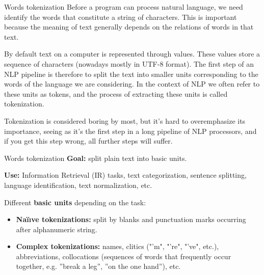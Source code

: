\begin{frame}[containsverbatim]{Words tokenization}
    Before a program can process natural language, we need identify the words that constitute a string of characters. This is important because the meaning of text generally depends on the relations of words in that text.
    
    By default text on a computer is represented through  values. These values store a sequence of characters (nowadays mostly in UTF-8 format). The first step of an NLP pipeline is therefore to split the text into smaller units corresponding to the words of the language we are considering. In the context of NLP we often refer to these units as tokens, and the process of extracting these units is called tokenization.
    
    Tokenization is considered boring by most, but it's hard to overemphasize its importance, seeing as it's the first step in a long pipeline of NLP processors, and if you get this step wrong, all further steps will suffer.
\end{frame}

\begin{frame}[containsverbatim]{Words tokenization}
    \textbf{Goal:} split plain text into basic units.
    
    \textbf{Use:} Information Retrieval (IR) tasks, text categorization, sentence splitting, language identification, text normalization, etc.
    
    Different \textbf{basic units} depending on the task:
    \begin{itemize}
        \item \textbf{Naïıve tokenizations:} split by blanks and punctuation marks occurring after alphanumeric string.
        \item \textbf{Complex tokenizations:} names, clitics ("'m", "'re", "'ve", etc.), abbreviations, collocations (sequences of words that frequently occur together, e.g. ”break a leg”, ”on the one hand”), etc.
    \end{itemize}
\end{frame}

